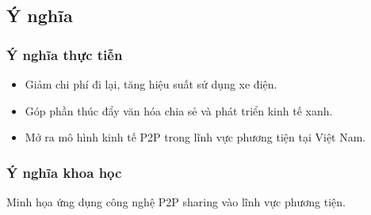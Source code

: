 \subsection{Ý nghĩa}
\subsubsection*{Ý nghĩa thực tiễn}
\begin{itemize}
    \item Giảm chi phí đi lại, tăng hiệu suất sử dụng xe điện.
    \item Góp phần thúc đẩy văn hóa chia sẻ và phát triển kinh tế xanh.
    \item Mở ra mô hình kinh tế P2P trong lĩnh vực phương tiện tại Việt Nam.
\end{itemize}

\subsubsection*{Ý nghĩa khoa học}

Minh họa ứng dụng công nghệ P2P sharing vào lĩnh vực phương tiện.